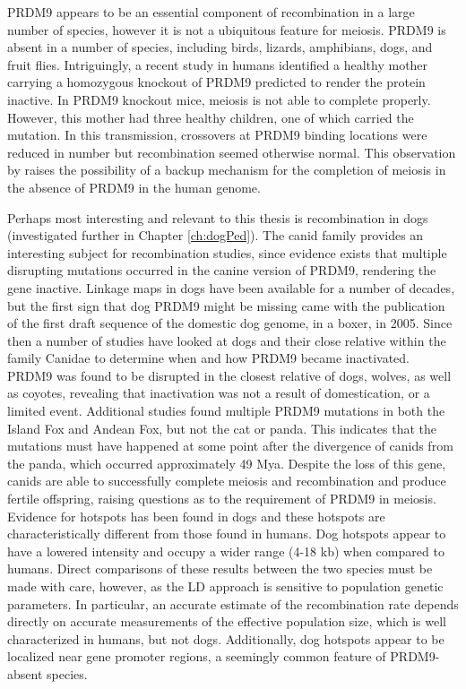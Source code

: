 PRDM9 appears to be an essential component of recombination in a large number of species, however it is not a ubiquitous feature for meiosis.
PRDM9 is absent in a number of species, including birds, lizards, amphibians, dogs, and fruit flies\cite{Ponting2011,Oliver2009}.
Intriguingly, a recent study in humans identified a healthy mother carrying a homozygous knockout of PRDM9 predicted to render the protein inactive\cite{Narasimhan2016}.
In PRDM9 knockout mice, meiosis is not able to complete properly\cite{Brick2012}.
However, this mother had three healthy children, one of which carried the mutation.
In this transmission, crossovers at PRDM9 binding locations were reduced in number but recombination seemed otherwise normal.
This observation by \citet{Narasimhan2016} raises the possibility of a backup mechanism for the completion of meiosis in the absence of PRDM9 in the human genome.


Perhaps most interesting and relevant to this thesis is recombination in dogs (investigated further in Chapter \ref{ch:dogPed}). %
The canid family provides an interesting subject for recombination studies, since evidence exists that multiple disrupting mutations occurred in the canine version of PRDM9, rendering the gene inactive.
Linkage maps in dogs have been available for a number of decades\cite{Mellersh1997,Neff1999}, but
the first sign that dog PRDM9 might be missing came with the publication of the first draft sequence of the domestic dog genome, in a boxer, in 2005\cite{Lindblad-Toh2005}.
Since then a number of studies have looked at dogs and their close relative within the family Canidae to determine when and how PRDM9 became inactivated.
PRDM9 was found to be disrupted in the closest relative of dogs, wolves, as well as coyotes\cite{Munoz-Fuentes2011}, revealing that inactivation was not a result of domestication, or a limited event.
Additional studies found multiple PRDM9 mutations in both the Island Fox and Andean Fox\cite{Auton2013}, but not the cat or panda\cite{Axelsson2012}.
This indicates that the mutations must have happened at some point after the divergence of canids from the panda, which occurred approximately 49 Mya\cite{Oliver2009,Axelsson2012}.
Despite the loss of this gene, canids are able to successfully complete meiosis and recombination and produce fertile offspring, raising questions as to the requirement of PRDM9 in meiosis.
Evidence for hotspots has been found in dogs and these hotspots are characteristically different from those found in humans.
Dog hotspots appear to have a lowered intensity and occupy a wider range (4-18 kb)\cite{Axelsson2012,Auton2013} when compared to humans.
Direct comparisons of these results between the two species must be made with care, however, as the LD approach is sensitive to population genetic parameters.
In particular, an accurate estimate of the recombination rate depends directly on accurate measurements of the effective population size, which is well characterized in humans, but not dogs.
Additionally, dog hotspots appear to be localized near gene promoter regions\cite{Auton2013}, a seemingly common feature of PRDM9-absent species.

